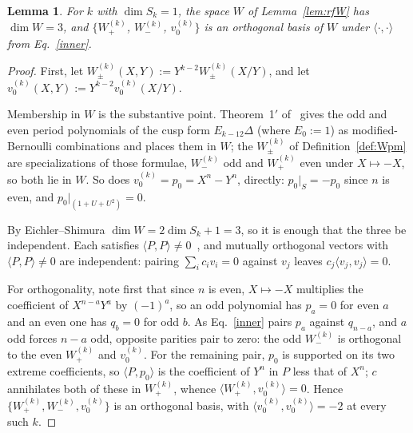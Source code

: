 \documentclass[11pt]{article}
\newtheorem{lemma}[theorem]{Lemma}
\begin{document}
\begin{lemma}\label{lem:Wbasis}
For $k$ with $\dim S_k=1$, the space $W$ of Lemma~\ref{lem:rfW} has $\dim W=3$, and $\{
W^{(k)}_+$, $W^{(k)}_-$, $v_0^{(k)}\}$ is an orthogonal basis of $W$ under $\langle\cdot,\cdot\rangle$ from Eq.~\eqref{inner}.
\end{lemma}
\begin{proof}
First, let $W_\pm^{(k)}(X, Y) := Y^{k-2} W_\pm^{(k)}(X/Y)$, and let $v_0^{(k)}(X, Y) := Y^{k-2} v_0^{(k)}(X/Y)$.

Membership in $W$ is the substantive point. Theorem~1$'$ of~\cite{KZ1984} gives the odd and even
period polynomials of the cusp form $E_{k-12}\Delta$ (where $E_0:=1$) as modified-Bernoulli
combinations and places them in $W$; the $W^{(k)}_\pm$ of Definition~\ref{def:Wpm} are
specializations of those formulae, $W^{(k)}_-$ odd and $W^{(k)}_+$ even under $X\mapsto-X$, so both
lie in $W$. So does $v_0^{(k)}=p_0=X^{n}-Y^{n}$, directly: $p_0|_S=-p_0$ since $n$ is even, and
$p_0|_{(1+U+U^2)}=0$.

By Eichler--Shimura $\dim W=2\dim S_k+1=3$, so it is enough that the three be independent. Each
satisfies $\langle P,P\rangle\neq0$~\cite{VerifyScripts}, and mutually orthogonal vectors with
$\langle P,P\rangle\neq0$ are independent: pairing $\sum_ic_iv_i=0$ against $v_j$ leaves
$c_j\langle v_j,v_j\rangle=0$.

For orthogonality, note first that since $n$ is even, $X\mapsto-X$ multiplies the coefficient of
$X^{n-a}Y^a$ by $(-1)^a$, so an odd polynomial has $p_a=0$ for even $a$ and an even one has $q_b=0$
for odd $b$. As Eq.~\eqref{inner} pairs $p_a$ against $q_{n-a}$, and $a$ odd forces $n-a$ odd,
opposite parities pair to zero: the odd $W^{(k)}_-$ is orthogonal to the even $W^{(k)}_+$ and
$v_0^{(k)}$. For the remaining pair, $p_0$ is supported on its two extreme coefficients, so
$\langle P,p_0\rangle$ is the coefficient of $Y^n$ in $P$ less that of $X^n$; $c$ annihilates both
of these in $W^{(k)}_+$, whence $\langle W^{(k)}_+,v_0^{(k)}\rangle=0$. Hence
$\{W^{(k)}_+,W^{(k)}_-,v_0^{(k)}\}$ is an orthogonal basis, with
$\langle v_0^{(k)},v_0^{(k)}\rangle=-2$ at every such $k$.
\end{proof}
\end{document}
